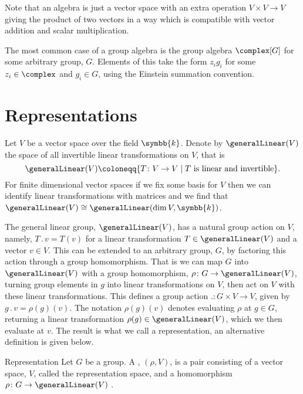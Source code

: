 \documentclass[fleqn]{NotesClass}
\renewcommand{\field}{\symbb{k}}
\newcommand{\action}{\mathbin{.}}
\newcommand{\isomorphic}{\cong}
\begin{document}
    Note that an algebra is just a vector space with an extra operation \(V \times V \to V\) giving the product of two vectors in a way which is compatible with vector addition and scalar multiplication.
        
    The most common case of a group algebra is the group algebra \(\complex[G]\) for some arbitrary group, \(G\).
    Elements of this take the form \(z_i g_i\) for some \(z_i \in \complex\) and \(g_i \in G\), using the Einstein summation convention.
    
    \section{Representations}%
    Let \(V\) be a vector space over the field \(\field\).
    Denote by \(\generalLinear(V)\) the space of all invertible linear transformations on \(V\), that is
    \begin{equation}
        \generalLinear(V) \coloneqq \{T \colon V \to V \mid T \text{ is linear and invertible}\}.
    \end{equation}
    For finite dimensional vector spaces if we fix some basis for \(V\) then we can identify linear transformations with matrices and we find that \(\generalLinear(V) \isomorphic \generalLinear(\dim V, \field)\).
    
    The general linear group, \(\generalLinear(V)\), has a natural group action on \(V\), namely, \(T \action v = T(v)\) for a linear transformation \(T \in \generalLinear(V)\) and a vector \(v \in V\).
    This can be extended to an arbitrary group, \(G\), by factoring this action through a group homomorphism.
    That is we can map \(G\) into \(\generalLinear(V)\) with a group homomorphism, \(\rho \colon G \to \generalLinear(V)\), turning group elements in \(g\) into linear transformations on \(V\), then act on \(V\) with these linear transformations.
    This defines a group action \(\action \colon G \times V \to V\), given by \(g \action v = \rho(g)(v)\).
    The notation \(\rho(g)(v)\) denotes evaluating \(\rho\) at \(g \in G\), returning a linear transformation \(\rho(g) \in \generalLinear(V)\), which we then evaluate at \(v\).
    The result is what we call a representation, an alternative definition is given below.
    
    \begin{dfn}{Representation}{}
        Let \(G\) be a group.
        A , \((\rho, V)\), is a pair consisting of a vector space, \(V\), called the representation space, and a homomorphism \(\rho \colon G \to \generalLinear(V)\) \cite[726]{hassani}.
    \end{dfn}
    
\end{document}

